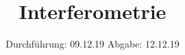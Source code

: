 

\subject{V64}
\title{Interferometrie}
\date{%
  Durchführung: 09.12.19
  \hspace{3em}
  Abgabe: 12.12.19
}



\maketitle
\thispagestyle{empty}
\tableofcontents
\newpage







\printbibliography{}


